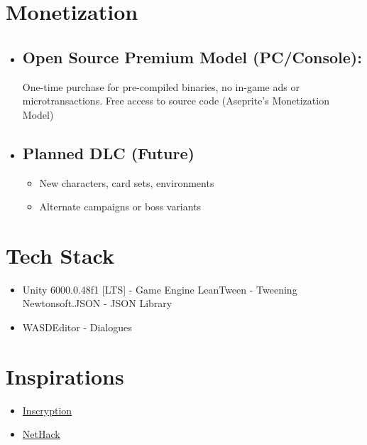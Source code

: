 \documentclass[10pt, a4paper]{article}
\begin{document}
	\section{Monetization}
	
	\begin{itemize}
		\item \subsection{Open Source Premium Model (PC/Console):} One-time purchase for pre-compiled binaries, no in-game ads or microtransactions. Free access to source code (Aseprite's Monetization Model)
		
		\item \subsection{Planned DLC (Future)}
		\begin{itemize}
			\item New characters, card sets, environments
			\item Alternate campaigns or boss variants
		\end{itemize}
	\end{itemize}
	
	\section{Tech Stack}
		\begin{itemize}
			\item Unity 6000.0.48f1 [LTS] - Game Engine
			\subitem LeanTween - Tweening
			\subitem Newtonsoft.JSON - JSON Library
			\item WASDEditor - Dialogues
		\end{itemize}
	\section{Inspirations}
	\begin{itemize}
		\item \href{https://www.inscryption.com}{Inscryption}
		\item \href{https://www.nethack.org}{NetHack}
	\end{itemize}
\end{document}
